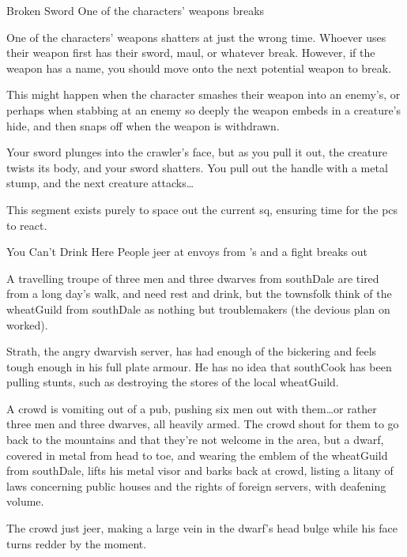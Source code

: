 {\squash Broken Sword}%
{One of the characters' weapons breaks}%

One of the characters' \glspl{weapon} shatters at just the wrong time.
Whoever uses their \gls{weapon} first has their sword, maul, or whatever break.
However, if the weapon has a name, you should move onto the next potential weapon to break.

This might happen when the character smashes their weapon into an enemy's, or perhaps when stabbing at an enemy so deeply the weapon embeds in a creature's hide, and then snaps off when the weapon is withdrawn.

\begin{boxtext}
  Your sword plunges into the \gls{crawler}'s face, but as you pull it out, the creature twists its body, and your sword shatters.
  You pull out the handle with a metal stump, and the next creature attacks\ldots
\end{boxtext}

This \gls{segment} exists purely to space out the current \gls{sq}, ensuring time for the \glspl{pc} to react.

{You Can't Drink Here}%
{People jeer at envoys from 's  and a fight breaks out}%

A travelling troupe of three men and three dwarves from \gls{southDale} are tired from a long day's walk, and need rest and drink, but the townsfolk think of the \gls{wheatGuild} from \gls{southDale} as nothing but troublemakers (the devious plan on  worked).

Strath, the angry dwarvish \gls{server}, has had enough of the bickering and feels tough enough in his full plate armour.
He has no idea that \gls{southCook} has been pulling stunts, such as destroying the stores of the local \gls{wheatGuild}.

\begin{boxtext}
  A crowd is vomiting out of a pub, pushing six men out with them\ldots or rather three men and three dwarves, all heavily armed.
  The crowd shout for them to go back to the mountains and that they're not welcome in the area, but a dwarf, covered in metal from head to toe, and wearing the emblem of the \gls{wheatGuild} from \gls{southDale}, lifts his metal visor and barks back at crowd, listing a litany of laws concerning public houses and the rights of foreign \glspl{server}, with deafening volume.

  The crowd just jeer, making a large vein in the dwarf's head bulge while his face turns redder by the moment.
\end{boxtext}

